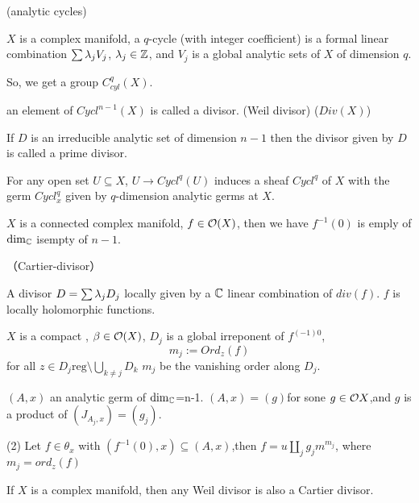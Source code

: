 \begin{definition}(analytic cycles)

$X$ is a complex manifold,  a $q$-cycle (with integer coefficient)
is a formal linear combination $\sum\limits\lambda_j V_j$, $\lambda_j\in\mathbb{Z}$,
and $V_j$ is a global analytic sets of $X$ of dimension $q$.
\end{definition}

So, we get a group $C_{cyl}^q(X)$.

an element of $Cycl^{n-1}(X)$ is called a divisor.
(Weil divisor)
($Div(X)$)

If $D$ is an irreducible analytic set of dimension $n-1$
then the divisor given by $D$ is called a prime divisor.

\begin{rem}
For any open set $U\subseteq X$, $U\to Cycl^q(U)$ induces a sheaf
$Cycl^q$ of $X$ with the germ $Cycl_x^q$ given by $q$-dimension analytic germs at $X$.
\end{rem}

\begin{thm}
$X$ is a connected complex manifold, $f\in\mathcal{O}(X)$,
then we have $f^{-1}(0)$ is emply of $\dim_{\mathbb{C}}$ isempty of $n-1$.
\end{thm}


\begin{definition}（Cartier-divisor）

A divisor $D=\sum\lambda_j D_j$ locally given by a $\mathbb{C}$ linear combination of $div(f)$.
$f$ is locally holomorphic functions.
\end{definition}

\begin{definition}
$X$ is a compact , $\beta\in\mathcal{O}(X)$,
$D_j$ is a global irreponent of $f^{(-1)0}$,
$$m_j:=Ord_z(f)$$
for all $z\in D_j{\text{reg}}\setminus \bigcup_{k\neq j} D_k $
$m_j$ be the vanishing order along $D_j$.
\end{definition}

\begin{thm}
$(A,x)$ an analytic germ of $\dim_{\mathbb{C}}$=n-1.
$(A,x)=(g)$for sone $g\in \mathcal{O} X$,and $g$ is a product of
$(J_{A_j,x})=(g_j)$.

(2) Let $f\in\theta_x$ with $(f^{-1}(0),x)\subseteq(A,x)$,then
$f=u\coprod_j g_jm^{m_j}$, where $m_j=ord_z (f)$
\end{thm}

\begin{prop}If $X$ is a complex manifold, then any Weil divisor is
also a Cartier divisor.
\end{prop}

